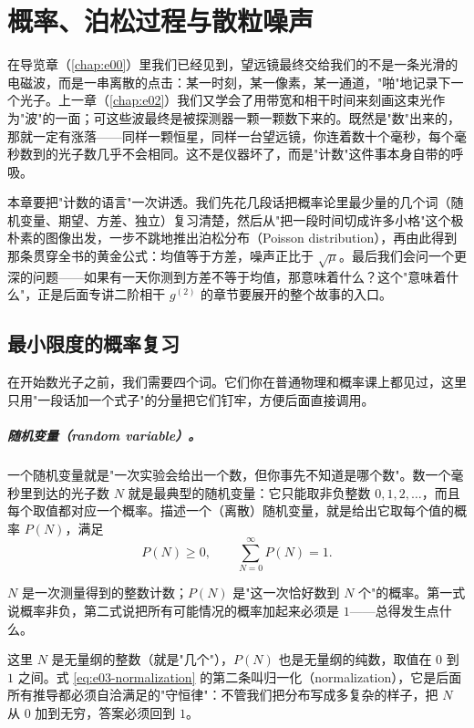\chapter{概率、泊松过程与散粒噪声}
\label{chap:e03}

\begin{chapteropening}
在导览章（\ref{chap:e00}）里我们已经见到，望远镜最终交给我们的不是一条光滑的电磁波，而是一串离散的点击：某一时刻，某一像素，某一通道，"啪"地记录下一个光子。上一章（\ref{chap:e02}）我们又学会了用带宽和相干时间来刻画这束光作为"波"的一面；可这些波最终是被探测器一颗一颗数下来的。既然是"数"出来的，那就一定有涨落——同样一颗恒星，同样一台望远镜，你连着数十个毫秒，每个毫秒数到的光子数几乎不会相同。这不是仪器坏了，而是"计数"这件事本身自带的呼吸。

本章要把"计数的语言"一次讲透。我们先花几段话把概率论里最少量的几个词（随机变量、期望、方差、独立）复习清楚，然后从"把一段时间切成许多小格"这个极朴素的图像出发，一步不跳地推出泊松分布（Poisson distribution），再由此得到那条贯穿全书的黄金公式：均值等于方差，噪声正比于 $\sqrt{\mu}$。最后我们会问一个更深的问题——如果有一天你测到方差不等于均值，那意味着什么？这个"意味着什么"，正是后面专讲二阶相干 $g^{(2)}$ 的章节要展开的整个故事的入口。
\end{chapteropening}

\section{最小限度的概率复习}
\label{sec:e03-review}

在开始数光子之前，我们需要四个词。它们你在普通物理和概率课上都见过，这里只用"一段话加一个式子"的分量把它们钉牢，方便后面直接调用。

\paragraph{随机变量（random variable）。}
一个随机变量就是"一次实验会给出一个数，但你事先不知道是哪个数"。数一个毫秒里到达的光子数 $N$ 就是最典型的随机变量：它只能取非负整数 $0,1,2,\dots$，而且每个取值都对应一个概率。描述一个（离散）随机变量，就是给出它取每个值的概率 $P(N)$，满足
\begin{equation}
  P(N)\ge 0,\qquad \sum_{N=0}^{\infty}P(N)=1 .
  \label{eq:e03-normalization}
\end{equation}
\begin{formulaexplain}
$N$ 是一次测量得到的整数计数；$P(N)$ 是"这一次恰好数到 $N$ 个"的概率。第一式说概率非负，第二式说把所有可能情况的概率加起来必须是 $1$——总得发生点什么。
\end{formulaexplain}
这里 $N$ 是无量纲的整数（就是"几个"），$P(N)$ 也是无量纲的纯数，取值在 $0$ 到 $1$ 之间。式 \eqref{eq:e03-normalization} 的第二条叫归一化（normalization），它是后面所有推导都必须自洽满足的"守恒律"：不管我们把分布写成多复杂的样子，把 $N$ 从 $0$ 加到无穷，答案必须回到 $1$。

